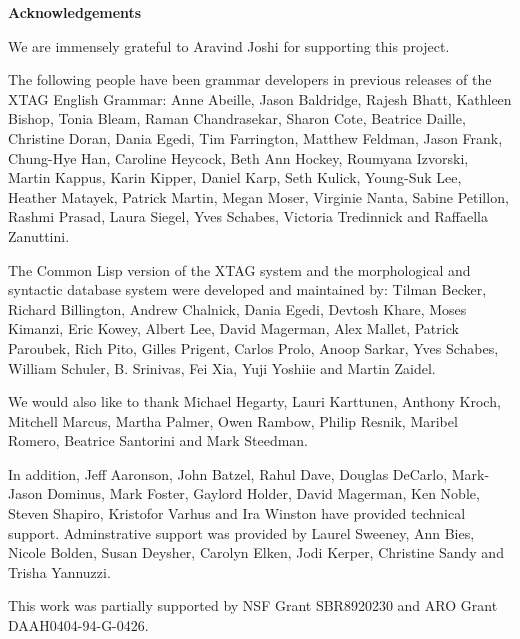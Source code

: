 \pagestyle{plain}
\null\vfil
\begin{center}
{\bf Acknowledgements}
\end{center}
\setcounter{page}{0}

We are immensely grateful to Aravind Joshi for supporting this
project. 

The following people have been grammar developers in previous releases
of the XTAG English Grammar: Anne Abeille, Jason Baldridge, Rajesh
Bhatt, Kathleen Bishop, Tonia Bleam, Raman Chandrasekar, Sharon Cote,
Beatrice Daille, Christine Doran, Dania Egedi, Tim Farrington, Matthew
Feldman, Jason Frank, Chung-Hye Han, Caroline Heycock, Beth Ann
Hockey, Roumyana Izvorski, Martin Kappus, Karin Kipper, Daniel Karp,
Seth Kulick, Young-Suk Lee, Heather Matayek, Patrick Martin, Megan
Moser, Virginie Nanta, Sabine Petillon, Rashmi Prasad, Laura Siegel,
Yves Schabes, Victoria Tredinnick and Raffaella Zanuttini.

The Common Lisp version of the XTAG system and the morphological and
syntactic database system were developed and maintained by: Tilman
Becker, Richard Billington, Andrew Chalnick, Dania Egedi, Devtosh
Khare, Moses Kimanzi, Eric Kowey, Albert Lee, David Magerman, Alex
Mallet, Patrick Paroubek, Rich Pito, Gilles Prigent, Carlos Prolo,
Anoop Sarkar, Yves Schabes, William Schuler, B. Srinivas, Fei Xia,
Yuji Yoshiie and Martin Zaidel.

We would also like to thank Michael Hegarty, Lauri Karttunen, Anthony
Kroch, Mitchell Marcus, Martha Palmer, Owen Rambow, Philip Resnik,
Maribel Romero, Beatrice Santorini and Mark Steedman.

In addition, Jeff Aaronson, John Batzel, Rahul Dave, Douglas DeCarlo,
Mark-Jason Dominus, Mark Foster, Gaylord Holder, David Magerman, Ken
Noble, Steven Shapiro, Kristofor Varhus and Ira Winston have provided
technical support.  Adminstrative support was provided by Laurel
Sweeney, Ann Bies, Nicole Bolden, Susan Deysher, Carolyn Elken, Jodi
Kerper, Christine Sandy and Trisha Yannuzzi.

This work was partially supported by  NSF Grant SBR8920230 and ARO Grant
DAAH0404-94-G-0426. 

\newpage

